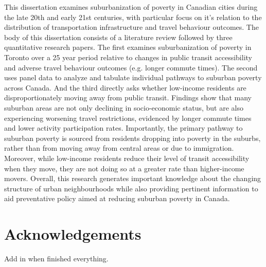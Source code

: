 \documentclass[11 pt, letterpaper]{report}
\begin{document}
This dissertation examines suburbanization of poverty in Canadian cities during the late 20th and early 21st centuries, with particular focus on it's relation to the distribution of transportation infrastructure and travel behaviour outcomes. The body of this dissertation consists of a literature review followed by three quantitative research papers. The first examines suburbanization of poverty in Toronto over a 25 year period relative to changes in public transit accessibility and adverse travel behaviour outcomes (e.g. longer commute times). The second uses panel data to analyze and tabulate individual pathways to suburban poverty across Canada. And the third directly asks whether low-income residents are disproportionately moving away from public transit. Findings show that many suburban areas are not only declining in socio-economic status, but are also experiencing worsening travel restrictions, evidenced by longer commute times and lower activity participation rates. Importantly, the primary pathway to suburban poverty is sourced from residents dropping into poverty in the suburbs, rather than from moving away from central areas or due to immigration. Moreover, while low-income residents reduce their level of transit accessibility when they move, they are not doing so at a greater rate than higher-income movers. Overall, this research generates important knowledge about the changing structure of urban neighbourhoods while also providing pertinent information to aid preventative policy aimed at reducing suburban poverty in Canada.





\vspace{12mm}



\newpage


\chapter*{\Large{Acknowledgements}}


Add in when finished everything.



%
%
%
%
\end{document}
